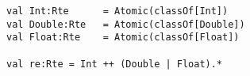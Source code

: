 \begin{lstlisting}[style=scalaioScala]
val Int:Rte      = Atomic(classOf[Int])
val Double:Rte   = Atomic(classOf[Double])
val Float:Rte    = Atomic(classOf[Float])

val re:Rte = Int ++ (Double | Float).*
\end{lstlisting}
